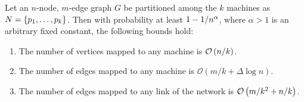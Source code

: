 \begin{frame}
    \begin{lemma}\label{lem:more-acc-mapping-lemma}
        Let an \(n\)-node, \(m\)-edge graph \(G\) be partitioned among the \(k\)
        machines as \(N = \left\{p_1, \ldots, p_k\right\}\). Then with probability at
        least \(1 - 1 / n^\alpha\), where \(\alpha > 1\) is an arbitrary
        fixed constant, the following bounds hold:
        \begin{enumerate}
            \item The number of vertices mapped to any machine is \(\mathcal{O}\left(n/k\right)\).
            \item The number of edges mapped to any machine is \(\mathcal{O}(m/k + \Delta \log n)\).
            \item The number of edges mapped to any link of the network is \(\mathcal{O}\left(m/k^2 + n/k\right)\).
        \end{enumerate}
    \end{lemma}
\end{frame}